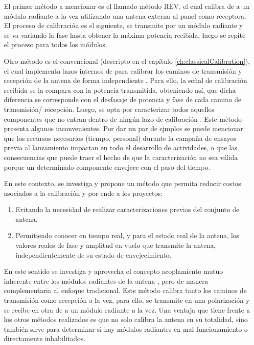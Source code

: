 El primer método a mencionar es el llamado método REV, el cual calibra de a un módulo radiante a la vez utilizando una
antena externa al panel como receptora. El proceso de calibración es el siguiente, se transmite por un módulo radiante
y se va variando la fase hasta obtener la máxima potencia recibida, luego se repite el proceso para todos los módulos.

Otro método es el convencional (descripto en el capítulo \ref{ch:classicalCalibration}), el cual implementa lazos internos
de para calibrar los caminos de transmisión y recepción de la antena de forma independiente \cite{Makhoul2012}
\cite{Luscombe1990}\cite{Seifert1996}\cite{Dall1994}\cite{Freeman1995}\cite{Bibby2003}\cite{Bast2003}\cite{Stove2004}
\cite{Srivastava1996}\cite{Wang2010}. Para ello, la señal de calibración recibida se la compara con la potencia transmitida,
obteniendo así, que dicha diferencia se corresponde con el desfasaje de potencia y fase de cada camino de transmisión/
recepción. Luego, se opta por caracterizar todos aquellos componentes que no entran dentro de ningún lazo de calibración
\cite{Freeman1995}. Este método presenta algunos inconvenientes. Por dar un par de ejmplos se puede mencionar que los recursos
necesarios (tiempo, personal) durante la campaña de ensayos previa al lanzamiento impactan en todo el desarrollo de actividades,
o que las consecuencias que puede traer el hecho de que la caracterización no sea válida porque un determinado componente
envejece con el paso del tiempo.

En este contexto, se investiga y propone un método que permita reducir costos asociados a la calibración y por ende a los
proyectos:

\begin{enumerate}
    \item Evitando la necesidad de realizar caracterizaciones previas del conjunto de antena.
    \item Permitiendo conocer en tiempo real, y para el estado real de la antena, los valores reales de fase y amplitud en
		vuelo que transmite la antena, independientemente de su estado de envejecimiento.
\end{enumerate}

En este sentido se investiga y aprovecha el concepto acoplamiento mutuo inherente entre los módulos radiantes de la antena
\cite{Aumann1989}, pero de manera complementaria al enfoque tradicional. Este método calibra tanto los caminos de transmisión
como recepción a la vez, para ello, se transmite en una polarización y se recibe en otra de a un módulo radiante a la vez.
Una ventaja que tiene frente a los otros métodos realizados es que no solo calibra la antena en su totalidad, sino también
sirve para determinar si hay módulos radiantes en mal funcionamiento o directamente inhabilitados.


